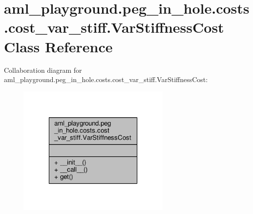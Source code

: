 \hypertarget{classaml__playground_1_1peg__in__hole_1_1costs_1_1cost__var__stiff_1_1_var_stiffness_cost}{\section{aml\-\_\-playground.\-peg\-\_\-in\-\_\-hole.\-costs.\-cost\-\_\-var\-\_\-stiff.\-Var\-Stiffness\-Cost Class Reference}
\label{classaml__playground_1_1peg__in__hole_1_1costs_1_1cost__var__stiff_1_1_var_stiffness_cost}
}


Collaboration diagram for aml\-\_\-playground.\-peg\-\_\-in\-\_\-hole.\-costs.\-cost\-\_\-var\-\_\-stiff.\-Var\-Stiffness\-Cost\-:
\nopagebreak
\begin{figure}[H]
\begin{center}
\leavevmode
\includegraphics[width=214pt]{classaml__playground_1_1peg__in__hole_1_1costs_1_1cost__var__stiff_1_1_var_stiffness_cost__coll__graph}
\end{center}
\end{figure}
